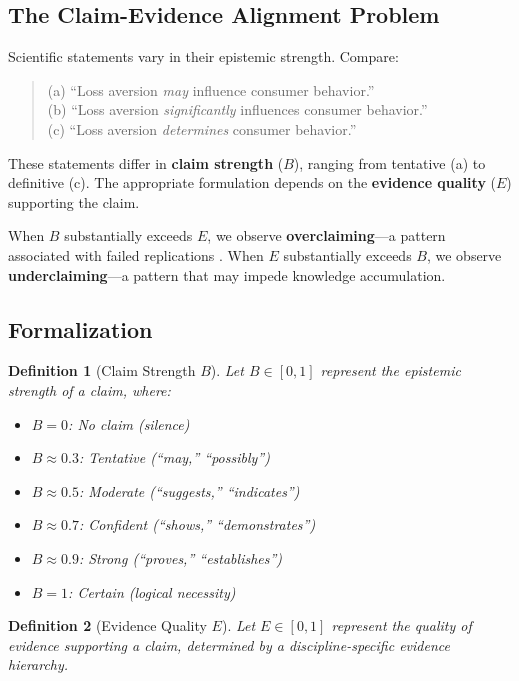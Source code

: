 \documentclass[11pt,a4paper]{article}
\newtheorem{definition}{Definition}
\begin{document}
\subsection{The Claim-Evidence Alignment Problem}

Scientific statements vary in their epistemic strength. Compare:

\begin{quote}
(a) ``Loss aversion \textit{may} influence consumer behavior.'' \\
(b) ``Loss aversion \textit{significantly} influences consumer behavior.'' \\
(c) ``Loss aversion \textit{determines} consumer behavior.''
\end{quote}

These statements differ in \textbf{claim strength} ($B$), ranging from
tentative (a) to definitive (c). The appropriate formulation depends on
the \textbf{evidence quality} ($E$) supporting the claim.

When $B$ substantially exceeds $E$, we observe \textbf{overclaiming}---a
pattern associated with failed replications \citep{Ioannidis2005}. When
$E$ substantially exceeds $B$, we observe \textbf{underclaiming}---a
pattern that may impede knowledge accumulation.

\subsection{Formalization}

\begin{definition}[Claim Strength $B$]
Let $B \in [0, 1]$ represent the epistemic strength of a claim, where:
\begin{itemize}
    \item $B = 0$: No claim (silence)
    \item $B \approx 0.3$: Tentative (``may,'' ``possibly'')
    \item $B \approx 0.5$: Moderate (``suggests,'' ``indicates'')
    \item $B \approx 0.7$: Confident (``shows,'' ``demonstrates'')
    \item $B \approx 0.9$: Strong (``proves,'' ``establishes'')
    \item $B = 1$: Certain (logical necessity)
\end{itemize}
\end{definition}

\begin{definition}[Evidence Quality $E$]
Let $E \in [0, 1]$ represent the quality of evidence supporting a claim,
determined by a discipline-specific evidence hierarchy.
\end{definition}
\end{document}
